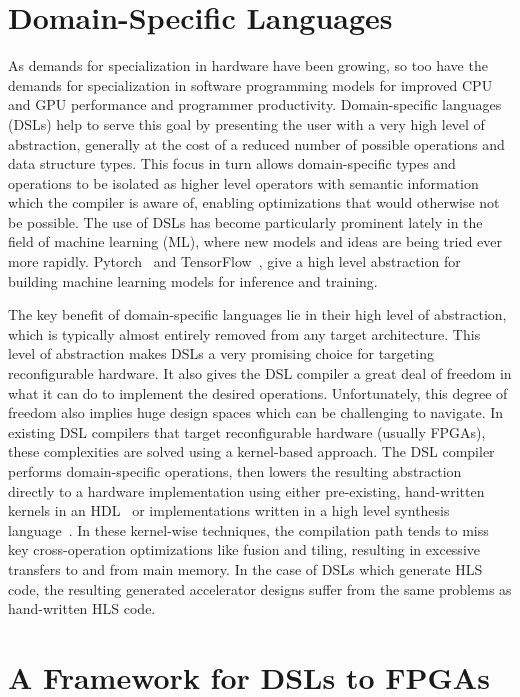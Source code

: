 \section{Domain-Specific Languages}
As demands for specialization in hardware have been growing, so too have the demands for
specialization in software programming models for improved CPU and GPU performance and programmer productivity.
Domain-specific languages (DSLs) help to serve this goal by presenting the user with a very high level of abstraction, generally
at the cost of a reduced number of possible operations and data structure types.
This focus in turn allows domain-specific types and operations to be isolated as
higher level operators with semantic information which the compiler is aware of,
enabling optimizations that would otherwise not be possible.
The use of DSLs has become particularly prominent lately in the field of machine learning (ML),
where new models and ideas are being tried ever more rapidly. Pytorch~\cite{pytorch} and TensorFlow~\cite{tensorflow},
give a high level abstraction for building machine learning models for inference and training.

The key benefit of domain-specific languages lie in their
high level of abstraction, which is typically almost entirely removed from any target
architecture. This level of abstraction makes DSLs a very promising choice for targeting reconfigurable
hardware.
It also gives the DSL compiler a great deal of freedom in what it can do to implement the
desired operations. Unfortunately, this degree of freedom also implies huge design spaces
which can be challenging to navigate.
In existing DSL compilers that target reconfigurable hardware (usually FPGAs),
these complexities are solved using a kernel-based approach.
The DSL compiler performs domain-specific operations, then lowers the resulting
abstraction directly to a hardware implementation using either pre-existing, hand-written kernels in
an HDL~\cite{TODO} or implementations written in a high level synthesis language~\cite{george14fpl}.
In these kernel-wise techniques, the compilation path tends to miss key cross-operation optimizations
like fusion and tiling, resulting in excessive transfers to and from main memory.
In the case of DSLs which generate HLS code, the resulting generated accelerator designs suffer from the
same problems as hand-written HLS code.

\section{A Framework for DSLs to FPGAs}

